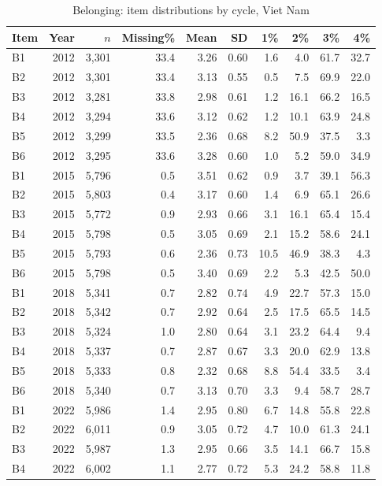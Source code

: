 \begin{table}[H]\centering\scriptsize
\caption{Belonging: item distributions by cycle, Viet Nam}\label{tab:itemsB}
\begin{tabular}{@{}lrrrrrrrrr@{}}
\toprule
Item & Year & $n$ & Missing\% & Mean & SD & 1\% & 2\% & 3\% & 4\%\\
\midrule
B1 & 2012 & 3,301 & 33.4 & 3.26 & 0.60 & 1.6 & 4.0 & 61.7 & 32.7\\
B2 & 2012 & 3,301 & 33.4 & 3.13 & 0.55 & 0.5 & 7.5 & 69.9 & 22.0\\
B3 & 2012 & 3,281 & 33.8 & 2.98 & 0.61 & 1.2 & 16.1 & 66.2 & 16.5\\
B4 & 2012 & 3,294 & 33.6 & 3.12 & 0.62 & 1.2 & 10.1 & 63.9 & 24.8\\
B5 & 2012 & 3,299 & 33.5 & 2.36 & 0.68 & 8.2 & 50.9 & 37.5 & 3.3\\
B6 & 2012 & 3,295 & 33.6 & 3.28 & 0.60 & 1.0 & 5.2 & 59.0 & 34.9\\
B1 & 2015 & 5,796 & 0.5 & 3.51 & 0.62 & 0.9 & 3.7 & 39.1 & 56.3\\
B2 & 2015 & 5,803 & 0.4 & 3.17 & 0.60 & 1.4 & 6.9 & 65.1 & 26.6\\
B3 & 2015 & 5,772 & 0.9 & 2.93 & 0.66 & 3.1 & 16.1 & 65.4 & 15.4\\
B4 & 2015 & 5,798 & 0.5 & 3.05 & 0.69 & 2.1 & 15.2 & 58.6 & 24.1\\
B5 & 2015 & 5,793 & 0.6 & 2.36 & 0.73 & 10.5 & 46.9 & 38.3 & 4.3\\
B6 & 2015 & 5,798 & 0.5 & 3.40 & 0.69 & 2.2 & 5.3 & 42.5 & 50.0\\
B1 & 2018 & 5,341 & 0.7 & 2.82 & 0.74 & 4.9 & 22.7 & 57.3 & 15.0\\
B2 & 2018 & 5,342 & 0.7 & 2.92 & 0.64 & 2.5 & 17.5 & 65.5 & 14.5\\
B3 & 2018 & 5,324 & 1.0 & 2.80 & 0.64 & 3.1 & 23.2 & 64.4 & 9.4\\
B4 & 2018 & 5,337 & 0.7 & 2.87 & 0.67 & 3.3 & 20.0 & 62.9 & 13.8\\
B5 & 2018 & 5,333 & 0.8 & 2.32 & 0.68 & 8.8 & 54.4 & 33.5 & 3.4\\
B6 & 2018 & 5,340 & 0.7 & 3.13 & 0.70 & 3.3 & 9.4 & 58.7 & 28.7\\
B1 & 2022 & 5,986 & 1.4 & 2.95 & 0.80 & 6.7 & 14.8 & 55.8 & 22.8\\
B2 & 2022 & 6,011 & 0.9 & 3.05 & 0.72 & 4.7 & 10.0 & 61.3 & 24.1\\
B3 & 2022 & 5,987 & 1.3 & 2.95 & 0.66 & 3.5 & 14.1 & 66.7 & 15.8\\
B4 & 2022 & 6,002 & 1.1 & 2.77 & 0.72 & 5.3 & 24.2 & 58.8 & 11.8\\

\end{tabular}
\end{table}
